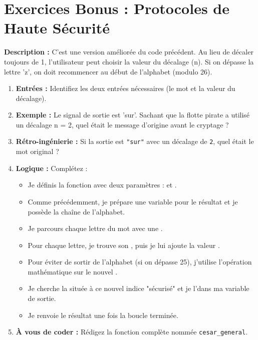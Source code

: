 \newpage

\section*{Exercices Bonus : Protocoles de Haute Sécurité}

\begin{Exercise}[title={Bonus 1 : Le Grand Décalage de César (Complexe) }]
\textbf{Description :} C'est une version améliorée du code précédent. Au lieu de décaler toujours de 1, l'utilisateur peut choisir la valeur du décalage (n). Si on dépasse la lettre 'z', on doit recommencer au début de l'alphabet (modulo 26).
\begin{enumerate}
\item \textbf{Entrées :} Identifiez les deux entrées nécessaires (le mot et la valeur du décalage).
\item \textbf{Exemple :} Le signal de sortie est 'sur'. Sachant que la flotte pirate a utilisé un décalage n = 2, quel était le message d'origine avant le cryptage ?
\item \textbf{Rétro-ingénierie :} Si la sortie est \texttt{"sur"} avec un décalage de \texttt{2}, quel était le mot original ?
\item \textbf{Logique :} Complétez :
    \begin{itemize}
        \item Je définis la fonction avec deux paramètres : \dotfill et \dotfill.
        \item Comme précédemment, je prépare une variable pour le résultat et je possède la chaîne de l'alphabet.
        \item Je parcours chaque lettre du mot avec une \dotfill.
        \item Pour chaque lettre, je trouve son \dotfill, puis je lui ajoute la valeur \dotfill.
        \item Pour éviter de sortir de l'alphabet (si on dépasse 25), j'utilise l'opération mathématique \dotfill sur le nouvel \dotfill.
        \item Je cherche la \dotfill située à ce nouvel indice "sécurisé" et je l'\dotfill dans ma variable de sortie.
        \item Je renvoie le résultat une fois la boucle terminée.
    \end{itemize}
\item \textbf{À vous de coder :} Rédigez la fonction complète nommée \texttt{cesar\_general}.
\end{enumerate}
\end{Exercise}

